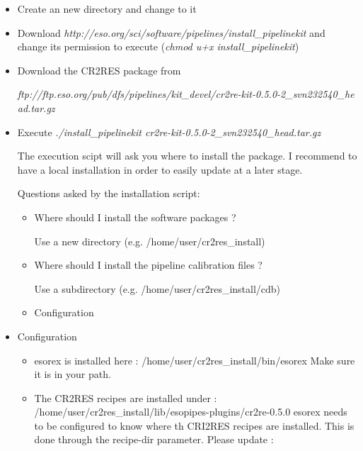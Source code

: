 \begin{itemize}
        \item Create an new directory and change to it
        \item Download {\it http://eso.org/sci/software/pipelines/install\_pipelinekit}
              and change its permission to execute ({\it chmod u+x install\_pipelinekit})
        \item Download the CR2RES package from

                      {\it
                              ftp://ftp.eso.org/pub/dfs/pipelines/kit\_devel/cr2re-kit-0.5.0-2\_svn232540\_he
                              ad.tar.gz}
        \item Execute {\it ./install\_pipelinekit
              cr2re-kit-0.5.0-2\_svn232540\_head.tar.gz}

              The execution scipt will ask you where to install the package. I recommend to
              have a local installation in order to easily update at a later stage.

              Questions asked by the installation script:
              \begin{itemize}

                      \item Where should I install the software packages ?

                            Use a new directory (e.g. /home/user/cr2res\_install)

                      \item Where should I install the pipeline calibration files ?

                            Use a subdirectory (e.g. /home/user/cr2res\_install/cdb)

                      \item Configuration
              \end{itemize}

        \item Configuration

              \begin{itemize}
                      \item esorex is installed here : /home/user/cr2res\_install/bin/esorex
                            Make sure it is in your path.

                      \item The CR2RES recipes are installed under :
                            /home/user/cr2res\_install/lib/esopipes-plugins/cr2re-0.5.0
                            esorex needs to be configured to know where th CRI2RES recipes are
                            installed. This is done through the recipe-dir parameter.
                            Please update :


\end{itemize}
\end{itemize}
